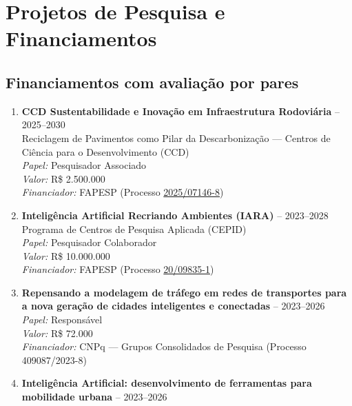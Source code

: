 \documentclass[
  brazilian,
  11pt,
  a4paper,
]{article}
\begin{document}
\section{Projetos de Pesquisa e
Financiamentos}\label{projetos-de-pesquisa-e-financiamentos}

\subsection{Financiamentos com avaliação por
pares}\label{financiamentos-com-avaliauxe7uxe3o-por-pares}

\begin{enumerate}
\def\labelenumi{\arabic{enumi}.}
\item
  \textbf{CCD Sustentabilidade e Inovação em Infraestrutura Rodoviária}
  -- 2025--2030\\
  Reciclagem de Pavimentos como Pilar da Descarbonização --- Centros de
  Ciência para o Desenvolvimento (CCD)\\
  \emph{Papel:} Pesquisador Associado\\
  \emph{Valor:} R\$ 2.500.000\\
  \emph{Financiador:} FAPESP (Processo
  \href{https://bv.fapesp.br/pt/auxilios/119284/ccd-sustentabilidade-e-inovacao-em-infraestrutura-rodoviaria-reciclagem-de-pavimentos-como-pilar-da-/?q=2025/07146-8}{2025/07146-8})
\item
  \textbf{Inteligência Artificial Recriando Ambientes (IARA)} --
  2023--2028\\
  Programa de Centros de Pesquisa Aplicada (CEPID)\\
  \emph{Papel:} Pesquisador Colaborador\\
  \emph{Valor:} R\$ 10.000.000\\
  \emph{Financiador:} FAPESP (Processo
  \href{https://bv.fapesp.br/pt/auxilios/111390/iara-inteligencia-artificial-recriando-ambientes/}{20/09835-1})
\item
  \textbf{Repensando a modelagem de tráfego em redes de transportes para
  a nova geração de cidades inteligentes e conectadas} -- 2023--2026\\
  \emph{Papel:} Responsável\\
  \emph{Valor:} R\$ 72.000\\
  \emph{Financiador:} CNPq --- Grupos Consolidados de Pesquisa (Processo
  409087/2023-8)
\item
  \textbf{Inteligência Artificial: desenvolvimento de ferramentas para
  mobilidade urbana} -- 2023--2026\\

\end{enumerate}
\end{document}
